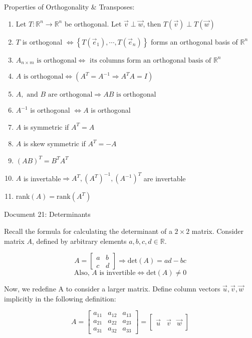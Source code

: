 \documentclass[11pt]{article}
\begin{document}
\noindent
Properties of Orthogonality \& Transposes:
\begin{enumerate}
\item Let $T:\mathbb{R}^n\rightarrow\mathbb{R}^n$ be orthogonal. Let $\vec{v}\perp\vec{w}$, then $T(\vec{v})\perp T(\vec{w})$
\item $T$ is orthogonal $\Leftrightarrow\left\lbrace T(\vec{e}_1),\cdots,T(\vec{e}_n)\right\rbrace$ forms an orthogonal basis of $\mathbb{R}^n$
\item $A_{n\times m}\text{ is orthogonal}\Leftrightarrow\text{ its columns form an orthogonal basis of }\mathbb{R}^n$
\item $A\text{ is orthogonal}\Leftrightarrow (A^T=A^{-1}\Rightarrow A^TA=I)$
\item $A,\text{ and }B\text{ are orthogonal}\Rightarrow AB\text{ is orthogonal}$
\item $A^{-1}$ is orthogonal $\Leftrightarrow A$ is orthogonal
\item $A$ is symmetric if $A^T=A$
\item $A$ is skew symmetric if $A^T=-A$
\item $(AB)^T=B^TA^T$
\item $A$ is invertable$\Rightarrow A^T,(A^T)^{-1},(A^{-1})^T$ are invertable
\item rank$(A)=\text{rank}(A^T)$
\end{enumerate}

\newpage
\begin{center}
Document 21: Determinants
\end{center}

\vspace{0.25cm}
Recall the formula for calculating the determinant of a $2\times 2$ matrix. Consider matrix $A$, defined by arbitrary elements $a,b,c,d\in\mathbb{R}$.

$$A=\begin{bmatrix}a & b\\ c & d\end{bmatrix}\Rightarrow \text{det}(A)=ad-bc$$
$$\text{Also, }A\text{ is invertible}\Leftrightarrow \text{det}(A)\neq 0$$

Now, we redefine A to consider a larger matrix. Define column vectors $\vec{u},\vec{v},\vec{w}$ implicitly in the following definition:

$$A=\begin{bmatrix}a_{11} & a_{12} & a_{13}\\a_{21} & a_{22} & a_{23}\\a_{31} & a_{32} & a_{33}\end{bmatrix}=\begin{bmatrix} & & \\\vec{u} & \vec{v} & \vec{w}\\ & & \end{bmatrix}$$
\end{document}
